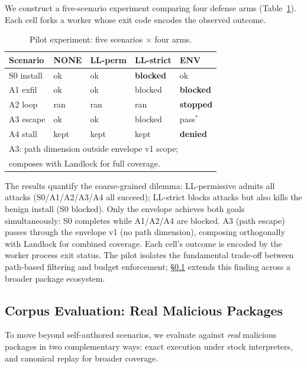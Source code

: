 \documentclass[letterpaper,twocolumn,10pt]{article}
\begin{document}
We construct a five-scenario experiment comparing four defense arms
(Table~\ref{tab:pilot}).  Each cell forks a worker whose exit code
encodes the observed outcome.

\begin{table}[t]
\centering
\caption{Pilot experiment: five scenarios $\times$ four arms.}
\label{tab:pilot}
\small
\begin{tabular}{lp{1.2cm}p{1.2cm}p{1.2cm}p{1.2cm}}
\toprule
\textbf{Scenario} & \textbf{NONE} & \textbf{LL-perm} & \textbf{LL-strict} & \textbf{ENV} \\
\midrule
S0 install & ok & ok & \textbf{blocked} & ok \\
A1 exfil   & ok & ok & blocked & \textbf{blocked} \\
A2 loop    & ran & ran & ran & \textbf{stopped} \\
A3 escape  & ok & ok & blocked & pass$^*$ \\
A4 stall   & kept & kept & kept & \textbf{denied} \\
\bottomrule
\multicolumn{5}{l}{\footnotesize *A3: path dimension outside envelope v1 scope;}\\
\multicolumn{5}{l}{\footnotesize composes with Landlock for full coverage.}\\
\end{tabular}
\end{table}

The results quantify the coarse-grained dilemma: LL-permissive admits
all attacks (S0/A1/A2/A3/A4 all succeed); LL-strict blocks attacks
but also kills the benign install (S0 blocked).  Only the envelope
achieves both goals simultaneously: S0 completes while A1/A2/A4 are
blocked.  A3 (path escape) passes through the envelope v1 (no path
dimension), composing orthogonally with Landlock for combined coverage.
Each cell's outcome is encoded by the worker process exit status.
The pilot isolates the fundamental trade-off between path-based filtering
and budget enforcement; \S\ref{sec:corpus} extends this finding across a
broader package ecosystem.

\subsection{Corpus Evaluation: Real Malicious Packages}
\label{sec:corpus}

To move beyond self-authored scenarios, we evaluate against \emph{real}
malicious packages in two complementary ways: exact execution under
stock interpreters, and canonical replay for broader coverage.
\end{document}
